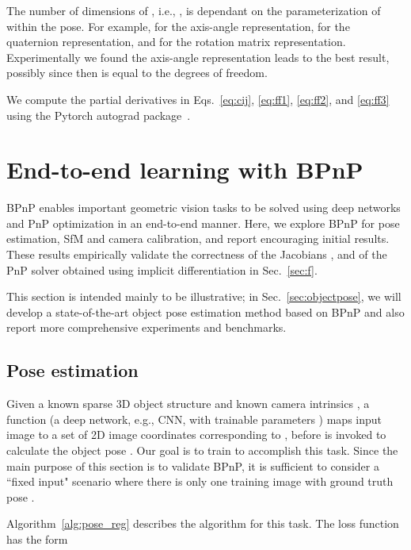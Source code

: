 \documentclass[10pt,twocolumn,letterpaper]{article}
\begin{document}
The number of dimensions of , i.e., , is dependant on the parameterization of  within the pose. For example,  for the axis-angle representation,  for the quaternion representation, and  for the rotation matrix representation. Experimentally we found the axis-angle representation leads to the best result, possibly since then  is equal to the degrees of freedom.





We compute the partial derivatives in Eqs.~\eqref{eq:cij}, \eqref{eq:ff1}, \eqref{eq:ff2}, and \eqref{eq:ff3} using the Pytorch autograd package~\cite{Paszke2017automatic}. 




\section{End-to-end learning with BPnP}

BPnP enables important geometric vision tasks to be solved using deep networks and PnP optimization in an end-to-end manner. Here, we explore BPnP for pose estimation, SfM and camera calibration, and report encouraging initial results. These results empirically validate the correctness of the Jacobians ,  and  of the PnP solver  obtained using implicit differentiation in Sec.~\ref{sec:f}.



This section is intended mainly to be illustrative; in Sec.~\ref{sec:objectpose}, we will develop a state-of-the-art object pose estimation method based on BPnP and also report more comprehensive experiments and benchmarks.

\subsection{Pose estimation}\label{sec:pose_reg}



Given a known sparse 3D object structure  and known camera intrinsics , a function  (a deep network, e.g., CNN, with trainable parameters ) maps input image  to a set of 2D image coordinates  corresponding to , before  is invoked to calculate the object pose . Our goal is to train  to accomplish this task. Since the main purpose of this section is to validate BPnP, it is sufficient to consider a ``fixed input" scenario where there is only one training image  with ground truth pose .

Algorithm~\ref{alg:pose_reg} describes the algorithm for this task. The loss function  has the form
\end{document}
